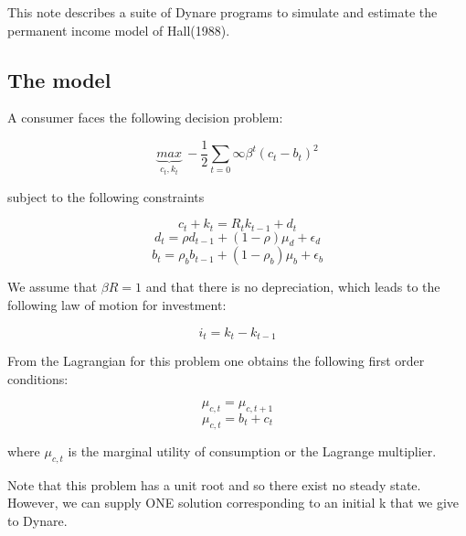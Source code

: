 \documentclass[a4paper,12pt]{scrartcl} %
\begin{document}
This note describes a suite of Dynare programs to simulate and estimate the permanent income model of Hall(1988).

\subsection{The model}

A consumer faces the following decision problem:

$$\underbrace{max}_{c_t,k_t}~-\frac{1}{2}\sum_{t=0}{\infty}\beta^t(c_t-b_t)^2$$

subject to the following constraints

$$c_t+k_t=R_tk_{t-1}+d_t$$
$$d_t=\rho d_{t-1}+(1-\rho)\mu_d+\epsilon_d$$
$$b_t=\rho_bb_{t-1}+(1-\rho_b)\mu_b+\epsilon_b$$

We assume that $\beta R=1$ and that there is no depreciation, which leads to the following law of motion for investment:

$$i_t=k_t-k_{t-1}$$

From the Lagrangian for this problem one obtains the following first order conditions:

$$\mu_{c,t}=\mu_{c,t+1}$$
$$\mu_{c,t}=b_t+c_t$$

where $\mu_{c,t}$ is the marginal utility of consumption or the Lagrange multiplier.

Note that this problem has a unit root and so there exist no steady state. However, we can supply ONE solution corresponding to an initial k that we give to Dynare.
\end{document}
